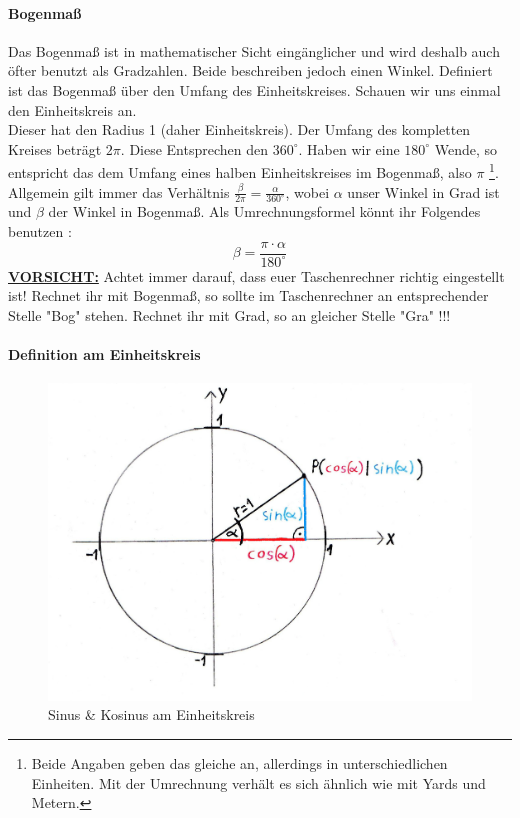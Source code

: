 		\paragraph{Bogenmaß}
			Das Bogenmaß ist in mathematischer Sicht eingänglicher und wird deshalb auch
			öfter benutzt als Gradzahlen. Beide beschreiben jedoch einen Winkel.
			Definiert ist das Bogenmaß über den Umfang des Einheitskreises. Schauen wir
			uns einmal den Einheitskreis an.\\
			Dieser hat den Radius 1 (daher Einheitskreis). Der Umfang des kompletten
			Kreises beträgt \(2\pi\). Diese Entsprechen den \(360^\circ\). Haben wir eine
			\(180^\circ\) Wende, so entspricht das dem Umfang eines halben
			Einheitskreises im Bogenmaß, also \(\pi\) \footnote{Beide Angaben geben das
			gleiche an, allerdings in unterschiedlichen Einheiten. Mit der Umrechnung
			verhält es sich ähnlich wie mit Yards und Metern.}. Allgemein gilt immer das
			Verhältnis \(\frac{\beta}{2\pi}=\frac{\alpha}{360^\circ}\), wobei \(\alpha\)
			unser Winkel in Grad ist und \(\beta\) der Winkel in Bogenmaß. Als
			Umrechnungsformel könnt ihr Folgendes benutzen :
			\[\beta=\frac{\pi \cdot \alpha}{180^\circ}\]
			\underline{\textbf{VORSICHT:}} Achtet immer darauf, dass euer Taschenrechner
			richtig eingestellt ist! Rechnet ihr mit Bogenmaß, so sollte im
			Taschenrechner an entsprechender Stelle "Bog" stehen. Rechnet ihr mit Grad,
			so an gleicher Stelle "Gra" !!!
		\paragraph{Definition am Einheitskreis}
	   
			\begin{figure}[h]
				\centering
				\includegraphics[scale=0.2]{Images/Einheitskreis.jpeg}
				\caption{Sinus \& Kosinus am Einheitskreis}
			\end{figure}
  
